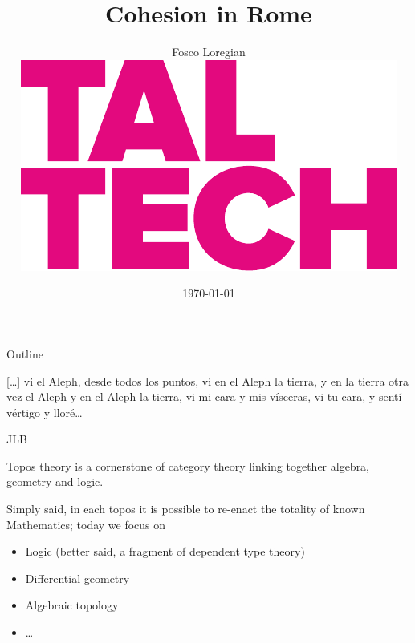 \documentclass[presentation]{beamer}
\author{Fosco Loregian \\[3pt] \includegraphics[scale=.25]{logo.pdf}}
\date{\today}
\title{Cohesion in Rome}
\begin{document}
\maketitle
\begin{frame}{Outline}
  \linespread{.66}
  \epigraph{\tiny [\dots\unkern] vi el Aleph, desde todos los puntos, vi en el Aleph la tierra, y en la tierra otra vez el Aleph y en el Aleph la tierra, vi mi cara y mis vísceras, vi tu cara, y sentí vértigo y lloré\dots }{JLB}
\linespread{1}
Topos theory is a cornerstone of category theory linking together algebra, geometry and logic.

Simply said, in each topos it is possible to re-enact the totality of known Mathematics; today we focus on 
\begin{itemize}
  \item Logic (better said, a fragment of \alert{dependent type theory})
  \item Differential geometry
  \item Algebraic topology
  \item \dots
\end{itemize}
\end{frame}
\end{document}
